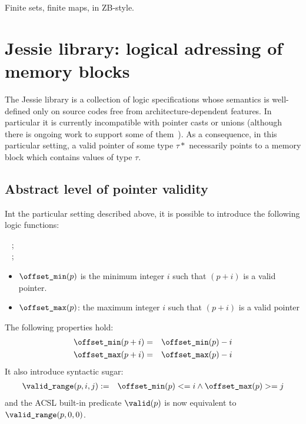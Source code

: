 Finite sets, finite maps, in ZB-style.


\section{Jessie library: logical adressing of memory blocks}
\label{sec:jessie}


The Jessie library is a collection of logic specifications whose
semantics is well-defined only on source codes free from
architecture-dependent features. In particular it is currently
incompatible with pointer casts or unions (although there is ongoing
work to support some of them~\cite{moy07ccpp}). As a consequence, in
this particular setting, a valid pointer of some type $\tau*$
necessarily points to a memory block which contains values of type
$\tau$.

\subsection{Abstract level of pointer validity}

Int the particular setting described above, it is possible to
introduce the following logic functions:
\begin{flushleft}
\integer ~ ; \\
\integer ~ ;
\end{flushleft}

\begin{itemize}
\item $\texttt{{\textbackslash}offset\_min}(p)$ is the minimum integer $i$ such that $(p+i)$ is a
  valid pointer.

\item $\texttt{{\textbackslash}offset\_max}(p)$: the maximum integer $i$ such that $(p+i)$ is a
  valid pointer
\end{itemize}
The following properties hold:
\begin{eqnarray*}
\texttt{{\textbackslash}offset\_min}(p+i) &=& \texttt{{\textbackslash}offset\_min}(p)-i \\
\texttt{{\textbackslash}offset\_max}(p+i) &=& \texttt{{\textbackslash}offset\_max}(p)-i
\end{eqnarray*}
It also introduce syntactic sugar:
\begin{eqnarray*}
\texttt{{\textbackslash}valid\_range}(p,i,j) &:=& \texttt{{\textbackslash}offset\_min}(p) <= i \land \texttt{{\textbackslash}offset\_max}(p) >= j
\end{eqnarray*}
and the ACSL built-in predicate $\texttt{{\textbackslash}valid}(p)$ is now equivalent to
$\texttt{{\textbackslash}valid\_range}(p,0,0)$.

